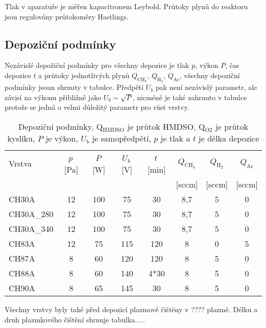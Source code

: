 Tlak v aparatuře je měřen kapacitronem Leybold. Průtoky plynů do reaktoru jsou regulovány průtokoměry Hastlings. 

\subsection{Depoziční podmínky}

Nezávislé depožiční podmínky pro všechny depozice je tlak $p$, výkon $P$, čas depozice $t$ a průtoky jednotlivých plynů $Q_{\mathrm{CH_4}}$, $Q_{\mathrm{H_2}}$, $Q_{\mathrm{Ar}}$, všechny depoziční podmínky jsoun shrnuty v tabulce. Předpětí $U_b$ pak není nezávislý parametr, ale závisí na výkonu přibližně jako $U_b \sim \sqrt{P}$, nicméně je také zahrnuto v tabulce protože se jedná o velmi důležitý parametr pro růst vrstvy.

\begin{table}[htbp]
 \centering
 \begin{tabular}{lccccccc}
	\hline
	{Vrstva} & {$p$\,[Pa]} & {$P$\,[W]} & {$U_b$\,[V]} & {$t$\,[min]} & {$Q_{\mathrm{CH_4}}$} & {$Q_\mathrm{H_2}$} & {$Q_\mathrm{Ar}$} \\
	& & & & & {[sccm]} & {[sccm]} & {[sccm]} \\
	\hline\hline
	CH30A     & 12 & 100 & 75  & 30   & 8,7 & 5 & 0 \\
	CH30A\_280 & 12 & 100 & 75  & 30   & 8,7 & 5 & 0 \\
	CH30A\_340 & 12 & 100 & 75  & 30   & 8,7 & 5 & 0 \\
	CH83A     & 12 & 75  & 115 & 120  & 8   & 0 & 5 \\
	CH87A     & 8  & 60  & 120 & 120  & 8   & 5 & 0 \\
	CH88A     & 8  & 60  & 140 & 4*30 & 8   & 5 & 0	\\
	CH90A     & 8  & 65  & 145 & 30   & 8   & 5 & 0 \\
	\hline
 \end{tabular}
 \caption{Depoziční podmínky, Q$_\mathrm{{HMDSO}}$ je průtok HMDSO, Q$_\mathrm{O2}$ je průtok kyslíku, $P$ je výkon, $U_b$ je samopředpětí, $p$ je tlak a $t$ je délka depozice}
\end{table}

Všechny vrstvy byly také před depozicí plazmově čištěny v ???? plazmě. Délku a druh plazmkového čištění shrnuje tabulka.....

\cleardoublepage

